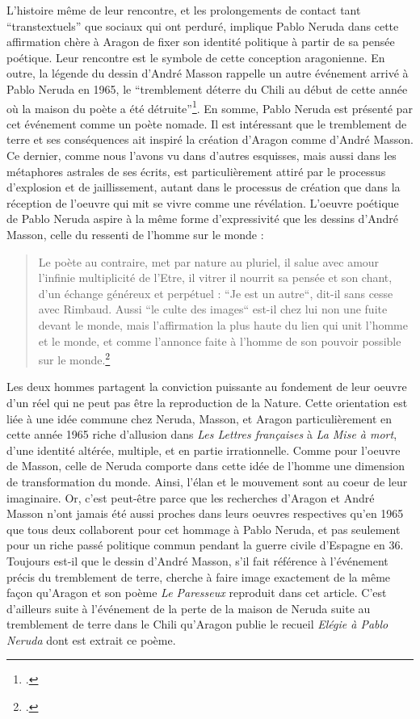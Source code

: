 L’histoire même de leur rencontre, et les prolongements de contact tant \enquote{transtextuels} que sociaux qui ont perduré, implique Pablo Neruda dans cette affirmation chère à Aragon de fixer son identité politique à partir de sa pensée poétique. Leur rencontre est le symbole de cette conception aragonienne. En outre, la légende du dessin d’André Masson rappelle un autre événement arrivé à Pablo Neruda en 1965, le \enquote{tremblement déterre du Chili au début de cette année où la maison du poète a été détruite}\footcite{pabloneruda}. En somme, Pablo Neruda est présenté par cet événement comme un poète nomade. Il est intéressant que le tremblement de terre et ses conséquences ait inspiré la création d’Aragon comme d’André Masson. Ce dernier, comme nous l’avons vu dans d’autres esquisses, mais aussi dans les métaphores astrales de ses écrits, est particulièrement attiré par le processus d’explosion et de jaillissement, autant dans le processus de création que dans la réception de l’oeuvre qui mit se vivre comme une révélation. L’oeuvre poétique de Pablo Neruda aspire à la même forme d’expressivité que les dessins d’André Masson, celle du ressenti de l’homme sur le monde :

\begin{quote}
Le poète au contraire, met par nature au pluriel, il salue avec amour l’infinie multiplicité de l’Etre, il vitrer il nourrit sa pensée et son chant, d’un échange généreux et perpétuel : “Je est un autre“, dit-il sans cesse avec Rimbaud. Aussi “le culte des images“ est-il chez lui non une fuite devant le monde, mais l’affirmation la plus haute du lien qui unit l’homme et le monde, et comme l’annonce faite à l’homme de son pouvoir possible sur le monde.\footcite{marcenac2004pablo}\end{quote}	


	Les deux hommes partagent la conviction puissante au fondement de leur oeuvre d’un réel qui ne peut pas être la reproduction de la Nature. Cette orientation est liée à une idée commune chez Neruda, Masson, et Aragon particulièrement en cette année 1965 riche d’allusion dans \emph{Les Lettres françaises} à \emph{La Mise à mort}, d’une identité altérée, multiple, et en partie irrationnelle. Comme pour l’oeuvre de Masson, celle de Neruda comporte dans cette idée de l’homme une dimension de transformation du monde. Ainsi, l’élan et le mouvement sont au coeur de leur imaginaire. Or, c’est peut-être parce que les recherches d’Aragon et André Masson n’ont jamais été aussi proches dans leurs oeuvres respectives qu’en 1965 que tous deux collaborent pour cet hommage à Pablo Neruda, et pas seulement pour un riche passé politique commun pendant la guerre civile d’Espagne en 36.  Toujours est-il que le dessin d’André Masson, s’il fait référence à l’événement précis du tremblement de terre, cherche à faire image exactement de la même façon qu’Aragon et son poème \emph{Le Paresseux} reproduit dans cet article. C’est d’ailleurs suite à l’événement de la perte de la maison de Neruda suite au tremblement de terre dans le Chili qu’Aragon publie le recueil \emph{Elégie à Pablo Neruda} dont est extrait ce poème. 


